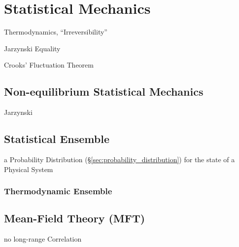 \section{Statistical Mechanics}\label{sec:statistical_mechanics}

Thermodynamics, ``Irreversibility''

Jarzynski Equality

Crooks' Fluctuation Theorem



\subsection{Non-equilibrium Statistical Mechanics}
\label{sec:nonequilibrium_statistical_mechanics}

Jarzynski



\subsection{Statistical Ensemble}\label{sec:statistical_ensemble}

a Probability Distribution (\S\ref{sec:probability_distribution}) for the state
of a Physical System



\subsubsection{Thermodynamic Ensemble}\label{sec:thermodynamic_ensemble}



\subsection{Mean-Field Theory (MFT)}\label{sec:mft}

no long-range Correlation

